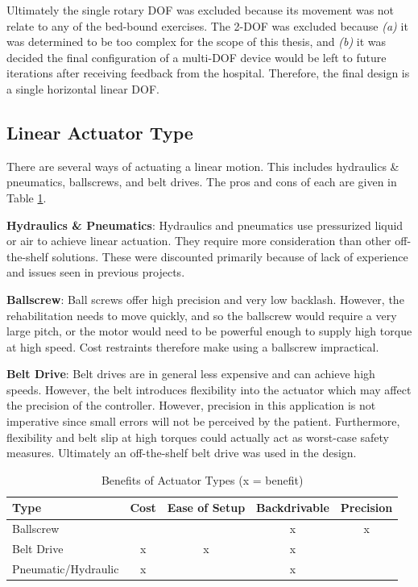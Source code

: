 \documentclass[12pt]{report}
\begin{document}
		Ultimately the single rotary DOF was excluded because its movement was not relate to any of the bed-bound exercises. The 2-DOF was excluded because \textit{(a)} it was determined to be too complex for the scope of this thesis, and \textit{(b)} it was decided the final configuration of a multi-DOF device would be left to future iterations after receiving feedback from the hospital. Therefore, the final design is a single horizontal linear DOF. 

					
		\subsection{Linear Actuator Type}

	There are several ways of actuating a linear motion. This includes hydraulics \& pneumatics, ballscrews, and belt drives. The pros and cons of each are given in Table \ref{tab:actuator}.
	
	\textbf{Hydraulics \& Pneumatics}: Hydraulics and pneumatics use pressurized liquid or air to achieve linear actuation. They require more consideration than other off-the-shelf solutions. These were discounted primarily because of lack of experience and issues seen in previous projects. 

	\textbf{Ballscrew}: Ball screws offer high precision and very low backlash. However, the rehabilitation needs to move quickly, and so the ballscrew would require a very large pitch, or the motor would need to be powerful enough to supply high torque at high speed. Cost restraints therefore make using a ballscrew impractical. 
	
	\textbf{Belt Drive}: Belt drives are in general less expensive and can achieve high speeds. However, the belt introduces flexibility into the actuator which may affect the precision of the controller. However, precision in this application is not imperative since small errors will not be perceived by the patient. Furthermore, flexibility and belt slip at high torques could actually act as worst-case safety measures. Ultimately an off-the-shelf belt drive was used in the design.


	
	\begin{table}[]
	\centering
	\caption{Benefits of Actuator Types (x = benefit)}	
	\begin{tabular}{|l|c|c|c|c|}
		\hline
		\textbf{Type} & \textbf{Cost} & \textbf{Ease of Setup} & 		\textbf{Backdrivable} & \textbf{Precision} \\ \hline
		Ballscrew &  &  & x & x \\ \hline
		Belt Drive & x & x & x & \\ \hline
		Pneumatic/Hydraulic & x &  & x & \\ \hline
		\end{tabular}
	\label{tab:actuator}
	\end{table}
				
\end{document}

